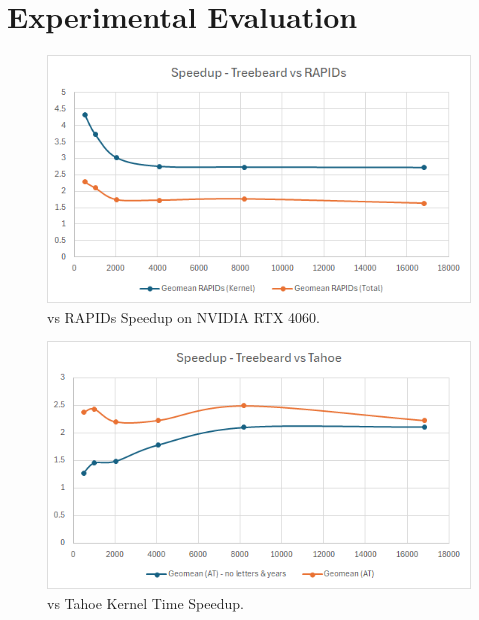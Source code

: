 \section{Experimental Evaluation}

\begin{figure}[htb]
  \centering
  \includegraphics[width=\linewidth]{figures/TBvsRAPIDs_4060_Speedup.png}
  \caption{\Treebeard{} vs RAPIDs Speedup on NVIDIA RTX 4060.}
  \label{Fig:TBvsRAPIDs_4060_Speedup}
\end{figure}

\begin{figure}[htb]
  \centering
  \includegraphics[width=\linewidth]{figures/TBvsTahoe_4060_KernelTimeSpeedup.png}
  \caption{\Treebeard{} vs Tahoe Kernel Time Speedup.}
  \label{Fig:TBvsTahoe_4060_KernelTimeSpeedup}
\end{figure}

